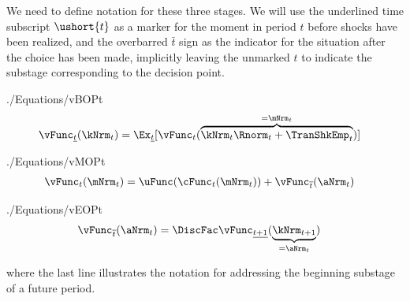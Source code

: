 \documentclass[titlepage, headings=optiontotocandhead]{\econtex}
\begin{document}
We need to define notation for these three stages. We will use the underlined time subscript $\ushort{t}$ as a marker for the moment in period $t$ before shocks have been realized, and the overbarred $\bar{t}$ sign as the indicator for the situation after the choice has been made, implicitly leaving the unmarked $t$ to indicate the substage corresponding to the decision point.
\newcommand{\BOPt}{{t-}}
\newcommand{\BOPtp}{{t+1-}}
\newcommand{\MOPt}{{t~}}
\newcommand{\EOPt}{{t+}}
\renewcommand{\BOPt}{{\underline{t}}}
\renewcommand{\BOPtp}{{\underline{t+1}}}
\renewcommand{\MOPt}{{t}}
\renewcommand{\EOPt}{\overline{t}}
\newcommand{\vBOPt}{\vFunc_{\BOPt}}
\newcommand{\vBOPtp}{\vFunc_{\BOPtp}}
\newcommand{\vMOPt}{\vFunc_{\MOPt}}
\newcommand{\vEOPt}{\vFunc_{\EOPt}}
\newcommand{\cEOPt}{\cFunc_{\EOPt}}
\newcommand{\vPEOPt}{\vFunc^{\prime}_{\EOPt}}
\begin{verbatimwrite}{./Equations/vBOPt}
  \begin{equation}\begin{gathered}\begin{aligned}
\vBOPt(\kNrm_{t}) & = \Ex_{\BOPt}[\vMOPt(\overbrace{\kNrm_{t} \Rnorm_{t} + \TranShkEmp_{t}}^{=\mNrm_{t}})]  \label{eq:vBOPt}
      \end{aligned}\end{gathered}\end{equation}
\end{verbatimwrite}
\unskip
\begin{verbatimwrite}{./Equations/vMOPt}
  \begin{equation}\begin{gathered}\begin{aligned}
\vMOPt(\mNrm_{t}) & = \uFunc(\cFunc_{t}(\mNrm_{t})) + \vEOPt(\aNrm_{t}) \label{eq:vMOPt}
      \end{aligned}\end{gathered}\end{equation}
\end{verbatimwrite}
\unskip
\begin{verbatimwrite}{./Equations/vEOPt}
  \begin{equation}\begin{gathered}\begin{aligned}
\vEOPt(\aNrm_{t}) & = \DiscFac \vBOPtp(\underbrace{\kNrm_{t+1}}_{=\aNrm_{t}}) \label{eq:vEOPt}
      \end{aligned}\end{gathered}\end{equation}
\end{verbatimwrite}
\unskip
where the last line illustrates the notation for addressing the beginning substage of a future period.
\end{document}
